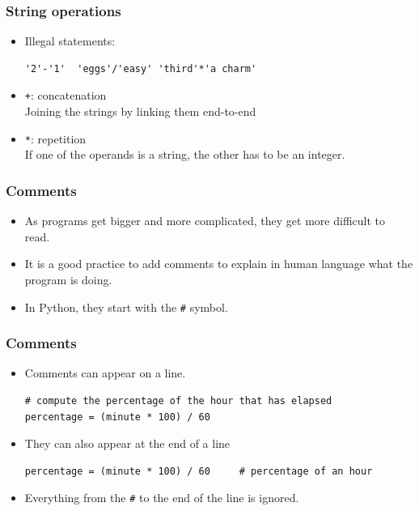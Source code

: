 \documentclass{beamer}
\begin{document}
\begin{frame}[fragile]

\frametitle{String operations}
\begin{itemize}
\item Illegal statements:
\begin{verbatim}
'2'-'1'  'eggs'/'easy' 'third'*'a charm'
\end{verbatim}

\item \texttt{+}:  \alert{concatenation}\\
 Joining the strings by
linking them end-to-end
\item \texttt{*}:  \alert{repetition}\\
 If one of the operands is a \alert{string}, the other has to be an \alert{integer}.
\end{itemize}
\end{frame}
\begin{frame}[fragile]
\frametitle{Comments}
\begin{itemize}
\item As programs get bigger and more complicated, they get more \alert{difficult
to read}.  
\item It is a good practice to add \alert{comments} to explain
in human language what the program is doing.  
\item In Python, they start with the \verb"#" symbol.
\end{itemize}
\end{frame}
\begin{frame}[fragile]
\frametitle{Comments}
\begin{itemize}
\item Comments can appear on a line.
\begin{block}{}
\tiny
\begin{verbatim}
# compute the percentage of the hour that has elapsed
percentage = (minute * 100) / 60
\end{verbatim}
\end{block}

\item They can also appear at the end of a line
\begin{block}{}
\tiny
\begin{verbatim}
percentage = (minute * 100) / 60     # percentage of an hour
\end{verbatim}
\end{block}
\item Everything from the \texttt{\#} to the end of the line is \alert{ignored}.
\end{itemize}
\end{frame}
\end{document}
